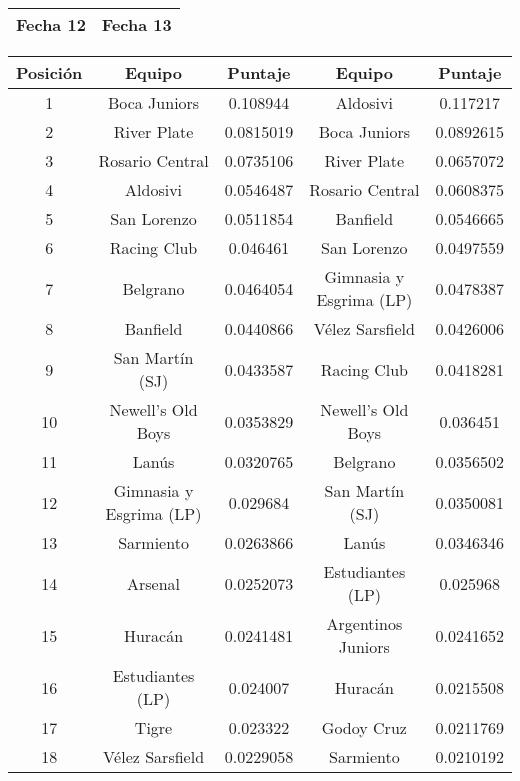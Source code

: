 \begin{table}[H]
	\center
	\begin{flushright}
	\begin{tabular}{| m{16.65em} || m{17.15em} |}
		\rowcolor{LightCyan}
		\hline Fecha 12 & Fecha 13 \\ \hline
	\end{tabular}

	\begin{tabular}{| c | c | c || c | c |}
	  	\hline
	  	\rowcolor{LightCyan}
	  	Posición & Equipo & Puntaje & Equipo & Puntaje \\ \hline \hline
		1 & \cellcolor{Gray} Boca Juniors & 0.108944 &  \cellcolor{Gray} Aldosivi & 0.117217 \\ \hline
		2 & River Plate & 0.0815019 & \cellcolor{Gray} Boca Juniors & 0.0892615 \\ \hline
		3 & Rosario Central & 0.0735106 & River Plate & 0.0657072 \\ \hline
		4 & \cellcolor{Gray} Aldosivi & 0.0546487 & Rosario Central & 0.0608375 \\ \hline
		5 & San Lorenzo & 0.0511854 & Banfield & 0.0546665 \\ \hline
		6 & Racing Club & 0.046461 & San Lorenzo & 0.0497559 \\ \hline
		7 & Belgrano & 0.0464054 & Gimnasia y Esgrima (LP) & 0.0478387 \\ \hline
		8 & Banfield & 0.0440866 & Vélez Sarsfield & 0.0426006 \\ \hline
		9 & San Martín (SJ) & 0.0433587 & Racing Club & 0.0418281\\ \hline
		10 & Newell's Old Boys & 0.0353829 & Newell's Old Boys & 0.036451 \\ \hline
		11 & Lanús & 0.0320765 & Belgrano & 0.0356502 \\ \hline
		12 & Gimnasia y Esgrima (LP) & 0.029684 & San Martín (SJ) & 0.0350081 \\ \hline
		13 & Sarmiento & 0.0263866 & Lanús & 0.0346346 \\ \hline
		14 & Arsenal & 0.0252073 & Estudiantes (LP) & 0.025968 \\ \hline
		15 & Huracán & 0.0241481 & Argentinos Juniors & 0.0241652 \\ \hline
		16 & Estudiantes (LP) & 0.024007 & Huracán & 0.0215508 \\ \hline
		17 & Tigre & 0.023322 & Godoy Cruz & 0.0211769 \\ \hline
		18 & Vélez Sarsfield & 0.0229058 & Sarmiento & 0.0210192 \\ \hline

\end{tabular}
\end{flushright}
\end{table}
